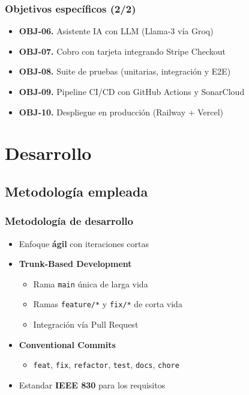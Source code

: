 \documentclass[xcolor=svgnames,aspectratio=169]{beamer}
\begin{document}
\begin{frame}
  \frametitle{Objetivos espec\'ificos (2/2)}
  \begin{itemize}
    \item \textbf{OBJ-06.} Asistente IA con LLM (Llama-3 v\'ia Groq) \smallskip
    \item \textbf{OBJ-07.} Cobro con tarjeta integrando Stripe Checkout \smallskip
    \item \textbf{OBJ-08.} Suite de pruebas (unitarias, integraci\'on y E2E) \smallskip
    \item \textbf{OBJ-09.} Pipeline CI/CD con GitHub Actions y SonarCloud \smallskip
    \item \textbf{OBJ-10.} Despliegue en producci\'on (Railway + Vercel)
  \end{itemize}
\end{frame}

\section{Desarrollo}

\subsection{Metodolog\'ia empleada}
\begin{frame}
  \frametitle{Metodolog\'ia de desarrollo}
  \begin{itemize}
    \item Enfoque \textbf{\'agil} con iteraciones cortas \medskip
    \item \textbf{Trunk-Based Development} \smallskip
    \begin{itemize}
      \item Rama \texttt{main} \'unica de larga vida \smallskip
      \item Ramas \texttt{feature/*} y \texttt{fix/*} de corta vida \smallskip
      \item Integraci\'on v\'ia Pull Request
    \end{itemize} \medskip
    \item \textbf{Conventional Commits} \smallskip
    \begin{itemize}
      \item \texttt{feat}, \texttt{fix}, \texttt{refactor}, \texttt{test}, \texttt{docs}, \texttt{chore}
    \end{itemize} \medskip
    \item Estandar \textbf{IEEE 830} para los requisitos
  \end{itemize}
\end{frame}
\end{document}
